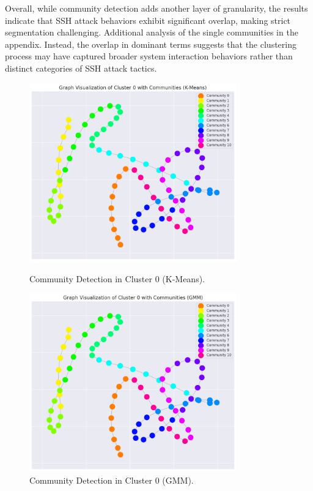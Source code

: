                 Overall, while community detection adds another layer of granularity, the results indicate that SSH attack behaviors exhibit significant overlap, making strict segmentation challenging. Additional analysis of the single communities in the appendix. 
                Instead, the overlap in dominant terms suggests that the clustering process may have captured broader system interaction behaviors rather than distinct categories of SSH attack tactics.
                \begin{figure}[h]
                    \centering
                    \begin{minipage}[c]{0.47\textwidth}
                        \centering
                        \includegraphics[width=0.8\textwidth]{../figures/plots/section3/k-means_graph_visualization_of_cluster_0_with_communities.png}
                        \caption{Community Detection in Cluster 0 (K-Means).}
                        \label{fig:kmeans_graph}
                    \end{minipage}
                    \hfill
                    \begin{minipage}[c]{0.47\textwidth}
                        \centering
                        \includegraphics[width=0.8\textwidth]{../figures/plots/section3/gmm_graph_visualization_of_cluster_0_with_communities.png}
                        \caption{Community Detection in Cluster 0 (GMM).}
                        \label{fig:gmm_graph}
                    \end{minipage}
                \end{figure}
            

